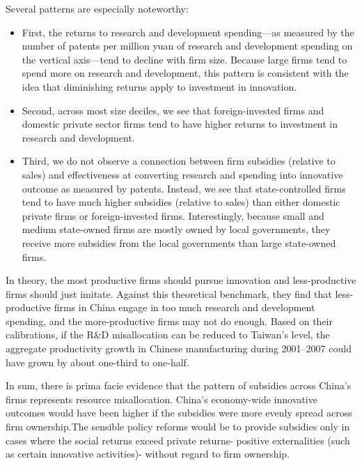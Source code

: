 \documentclass{article}
\begin{document}
    Several patterns are especially noteworthy:
    \begin{itemize}
        \item First, the returns to research and development spending—as measured by the number of patents per million yuan of research and development spending on the vertical axis—tend to decline with firm size. Because large firms tend to spend more on research and development, this pattern is consistent with the idea that diminishing returns apply to investment in innovation.
        \item Second, across most size deciles, we see that foreign-invested firms and domestic private sector firms tend to have higher returns to investment in research and development.
        \item Third, we do not observe a connection between firm subsidies (relative to sales) and effectiveness at converting research and spending into innovative outcome as measured by patents. Instead, we see that state-controlled firms tend to have much higher subsidies (relative to sales) than either domestic private firms or foreign-invested firms. Interestingly, because small and medium state-owned firms are mostly owned by local governments, they receive more subsidies from the local governments than large state-owned firms.
    \end{itemize} 
    
    In theory, the most productive firms should pursue innovation and less-productive firms should just imitate. Against this theoretical benchmark, they find that less-productive firms in China engage in too much research and development spending, and the more-productive firms may not do enough. Based on their calibrations, if the R\&D misallocation can be reduced to Taiwan's level, the aggregate productivity growth in Chinese manufacturing during 2001–2007 could have grown by about one-third to one-half.

    In sum, there is prima facie evidence that the pattern of subsidies across China’s firms represents resource misallocation. China’s economy-wide innovative outcomes would have been higher if the subsidies were more evenly spread across firm ownership.The sensible policy reforms would be to provide subsidies only in cases where the social returns exceed private returns- positive externalities (such as certain innovative activities)- without regard to firm ownership.
\end{document}
